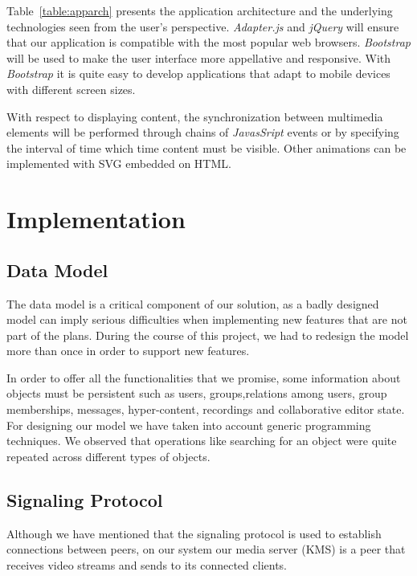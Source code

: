 \documentclass[conference,compsoc,a4paper]{IEEEtran}
\begin{document}
Table~\ref{table:apparch} presents the application architecture and the underlying technologies seen from the user's perspective. \emph{Adapter.js} and \emph{jQuery} will ensure that our application is compatible with the most popular web browsers.
\emph{Bootstrap} will be used to make the user interface more appellative and responsive. With \emph{Bootstrap} it is quite easy to develop applications that adapt to mobile devices with different screen sizes.

With respect to displaying content, the synchronization between multimedia elements will be performed through chains of \emph{JavasSript} events or by specifying the interval of time which time content must be visible. Other animations can be implemented with \gls{SVG} embedded on \gls{HTML}.

\section{Implementation}
\label{chapter:implementation}
\subsection{Data Model}

The data model is a critical component of our solution, as a badly designed model can imply serious difficulties when implementing new features that are not part of the plans. During the course of this project, we had to redesign the model more than once in order to support new features.

In order to offer all the functionalities that we promise, some information about objects must be persistent such as users, groups,relations among users, group memberships, messages, hyper-content, recordings and collaborative editor state. For designing our model we have taken into account generic programming techniques. We observed that operations like searching for an object were quite repeated across different types of objects. 

\subsection{Signaling Protocol}


Although we have mentioned that the signaling protocol is used to establish connections between peers, on our system our media server (\gls{KMS}) is a peer that receives video streams and sends to its connected clients. 
\end{document}
